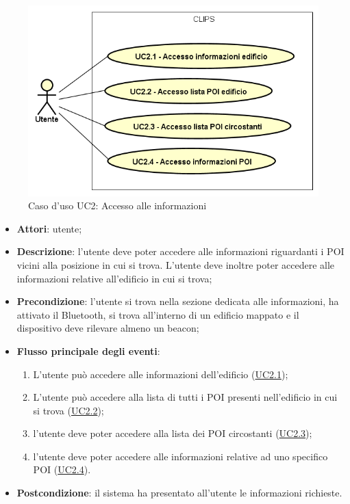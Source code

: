 \documentclass[../AnalisiDeiRequisiti.tex]{subfiles}
\begin{document}
\begin{figure}[H]
	\centering
	\includegraphics[scale=0.95, width=\textwidth]{img/UC2.png}
	\caption{Caso d'uso UC2: Accesso alle informazioni}\label{fig:UC2} 
\end{figure}
\begin{itemize}
	\item \textbf{Attori}: utente;
	\item \textbf{Descrizione}: l'utente deve poter accedere alle informazioni riguardanti i POI vicini alla posizione in cui si trova. L'utente deve inoltre poter accedere alle informazioni relative all'edificio in cui si trova; 
	\item \textbf{Precondizione}: l'utente si trova nella sezione dedicata alle informazioni, ha attivato il Bluetooth, si trova all'interno di un edificio mappato e il dispositivo deve rilevare almeno un beacon;
	
	\item \textbf{Flusso principale degli eventi}:
	\begin{enumerate}
		\item L'utente può accedere alle informazioni dell'edificio (\hyperlink{UC2.1}{UC2.1});
		\item L'utente può accedere alla lista di tutti i POI presenti nell'edificio in cui si trova (\hyperlink{UC2.2}{UC2.2});
		\item l'utente deve poter accedere alla lista dei POI circostanti (\hyperlink{UC2.3}{UC2.3});
		\item l'utente deve poter accedere alle informazioni relative ad uno specifico POI (\hyperlink{UC2.4}{UC2.4}).
		
	\end{enumerate}
	\item \textbf{Postcondizione}: il sistema ha presentato all'utente le informazioni richieste.
\end{itemize}
\hypertarget{UC2.1}{}
\end{document}
